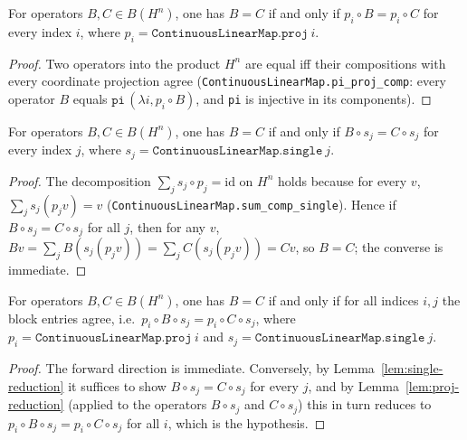 \begin{lemma}
    \label{lem:proj-reduction}
    \leanok
    For operators $B, C \in B(H^n)$, one has $B = C$ if and only if
    $p_i \circ B = p_i \circ C$ for every index $i$, where
    $p_i = \texttt{ContinuousLinearMap.proj}\ i$.
\end{lemma}
\begin{proof}
    Two operators into the product $H^n$ are equal iff their compositions with
    every coordinate projection agree
    (\texttt{ContinuousLinearMap.pi\_proj\_comp}: every operator $B$ equals
    $\texttt{pi}\,(\lambda i, p_i \circ B)$, and \texttt{pi} is injective in its
    components).
\end{proof}

\begin{lemma}
    \label{lem:single-reduction}
    \leanok
    For operators $B, C \in B(H^n)$, one has $B = C$ if and only if
    $B \circ s_j = C \circ s_j$ for every index $j$, where
    $s_j = \texttt{ContinuousLinearMap.single}\ j$.
\end{lemma}
\begin{proof}
    The decomposition $\sum_j s_j \circ p_j = \mathrm{id}$ on $H^n$ holds because
    for every $v$, $\sum_j s_j(p_j v) = v$
    (\texttt{ContinuousLinearMap.sum\_comp\_single}). Hence if
    $B \circ s_j = C \circ s_j$ for all $j$, then for any $v$,
    $B v = \sum_j B(s_j(p_j v)) = \sum_j C(s_j(p_j v)) = C v$, so $B = C$; the
    converse is immediate.
\end{proof}

\begin{lemma}
    \label{lem:blocks-eq}
    \leanok
    For operators $B, C \in B(H^n)$, one has $B = C$ if and only if for all
    indices $i, j$ the block entries agree, i.e.\
    $p_i \circ B \circ s_j = p_i \circ C \circ s_j$, where
    $p_i = \texttt{ContinuousLinearMap.proj}\ i$ and
    $s_j = \texttt{ContinuousLinearMap.single}\ j$.
\end{lemma}
\begin{proof}
    The forward direction is immediate. Conversely, by
    Lemma~\ref{lem:single-reduction} it suffices to show $B \circ s_j = C \circ s_j$
    for every $j$, and by Lemma~\ref{lem:proj-reduction} (applied to the operators
    $B \circ s_j$ and $C \circ s_j$) this in turn reduces to
    $p_i \circ B \circ s_j = p_i \circ C \circ s_j$ for all $i$, which is the
    hypothesis.
\end{proof}

